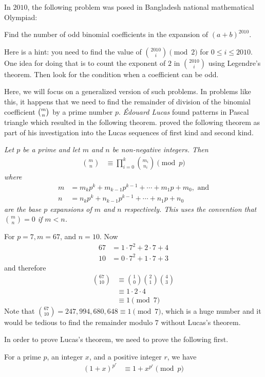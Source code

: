 \documentclass[12pt]{subfile}
\begin{document}
In $2010$, the following problem was posed in Bangladesh national mathematical Olympiad:
	\begin{problem}
		Find the number of odd binomial coefficients in the expansion of $(a+b)^{2010}$.
	\end{problem}
Here is a hint: you need to find the value of $\binom{2010}{i}\pmod2$ for $0\leq i\leq2010$. One idea for doing that is to count the exponent of $2$ in $\binom{2010}{i}$ using Legendre's theorem. Then look for the condition when a coefficient can be odd.

Here, we will focus on a generalized version of such problems. In problems like this, it happens that we need to find the remainder of division of the binomial coefficient $\tbinom{m}{n}$ by a prime number $p$. \textit{\'{E}douard Lucas} found patterns in Pascal triangle which resulted in the following theorem. \textcite[Page $230$, $\S$ XXI]{lucas_1878_2} proved the following theorem as part of his investigation into the Lucas sequences of first kind and second kind.
	\begin{theorem}\slshape
		Let $p$ be a prime and let $m$ and $n$ be non-negative integers. Then
			\begin{align*}
				\binom{m}{n}
					& \equiv\prod_{i=0}^k\binom{m_i}{n_i}\pmod p
			\end{align*}
		where
			\begin{align*}
				m & =m_kp^k+m_{k-1}p^{k-1}+\cdots +m_1p+m_0, \text{ and}\\
				n & =n_kp^k+n_{k-1}p^{k-1}+\cdots +n_1p+n_0
			\end{align*}
		are the base $p$ expansions of $m$ and $n$ respectively. This uses the convention that $\binom{m}{n}=0$ if $m<n$.
	\end{theorem}

	\begin{example}
		For $p=7, m=67$, and $n=10$. Now
			\begin{align*}
				67
					& = 1 \cdot 7^2 + 2 \cdot 7 + 4\\
				10
					& = 0 \cdot 7^2 + 1 \cdot 7 + 3
			\end{align*}
		and therefore
			\begin{align*}
				\binom{67}{10}
					& \equiv\binom{1}{0}\binom{2}{1}\binom{4}{3}\\
					& \equiv 1 \cdot 2 \cdot 4\\
					& \equiv 1 \pmod 7
			\end{align*}
		Note that $\binom{67}{10} = 247,994,680,648 \equiv 1 \pmod 7$, which is a huge number and it would be tedious to find the remainder modulo $7$ without Lucas's theorem.
	\end{example}
In order to prove Lucas's theorem, we need to prove the following first.
	\begin{lemma}
		For a prime $p$, an integer $x$, and a positive integer $r$, we have
			\begin{align*}
				(1+x)^{p^r}
					& \equiv 1+x^{p^r}\pmod{p}
			\end{align*}
	\end{lemma}
\end{document}
